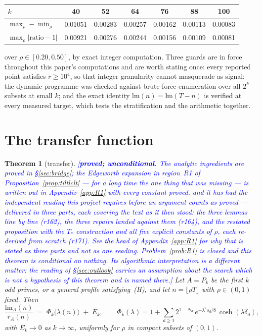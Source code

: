 \documentclass[11pt,a4paper]{article}
\theoremstyle{plain}
\newtheorem{theorem}{Theorem}[section]
\theoremstyle{definition}
\theoremstyle{remark}
\newcommand{\lm}{\mathrm{lm}}
\newcommand{\STATUS}[1]{\textcolor{blue}{\textsf{[#1]}}}
\begin{document}
\begin{center}
\begin{tabular}{lcccccc}
\toprule
$k$ & 40 & 52 & 64 & 76 & 88 & 100\\
\midrule
$\max_\rho-\min_\rho$ & 0.01051 & 0.00283 & 0.00257 & 0.00162 & 0.00113 & 0.00083\\
$\max_\rho|\mathrm{ratio}-1|$ & 0.00921 & 0.00276 & 0.00244 & 0.00156 & 0.00109 & 0.00081\\
\bottomrule
\end{tabular}
\end{center}

\noindent
over $\rho\in[0.20,0.50]$, by exact integer computation. Three guards are in force throughout
this paper's computations and are worth stating once: every reported point satisfies
$r\ge10^{4}$, so that integer granularity cannot masquerade as signal; the dynamic
programme was checked against brute-force enumeration over all $2^{k}$ subsets at small $k$;
and the exact identity $\lm(n)=\lm(T-n)$ is verified at every measured target, which tests the
stratification and the arithmetic together.

\section{The transfer function}\label{sec:transfer}

\begin{theorem}[transfer]\label{thm:transfer}
\STATUS{\textbf{proved; unconditional.} The analytic ingredients are proved in
\S\ref{sec:bridge}; the Edgeworth expansion in region~R1 of
Proposition~\ref{prop:tiltlclt} --- for a long time the one thing that was missing --- is
written out in Appendix~\ref{app:R1} with every constant proved, and it has had the independent reading this
project requires before an argument counts as proved --- \emph{delivered in three parts, each
covering the text as it then stood}: the three lemmas line by line (r162), the three repairs
landed against them (r164), and the restated proposition with the $T_{*}$ construction and all
five explicit constants of $\rho$, each re-derived from scratch (r171). See the head of
Appendix~\ref{app:R1} for why that is stated as three parts and not as one reading.
Problem~\ref{prob:R1} is closed and this theorem is conditional on nothing. \emph{Its
algorithmic interpretation is a different matter}: the reading of \S\ref{sec:outlook} carries an
assumption about the search which is not a hypothesis of this theorem and is named there.}
Let $A=P_k$ be the first $k$ odd primes, or a general profile satisfying~\textup{(H)}, and let
$n=\lfloor\rho T\rfloor$ with $\rho\in(0,1)$ fixed. Then
\begin{equation}\label{eq:phi}
  \frac{\lm_A(n)}{r_A(n)}\;=\;\Phi_k\bigl(\lambda(n)\bigr)\;+\;E_k,
  \qquad
  \Phi_k(\lambda)=1+\sum_{d\ge1}2^{1-N_d}\,
     e^{-\lambda^{2}s_d/8}\,\cosh(\lambda\delta_d),
\end{equation}
with $E_k\to0$ as $k\to\infty$, uniformly for $\rho$ in compact subsets of $(0,1)$.
\end{theorem}
\end{document}
